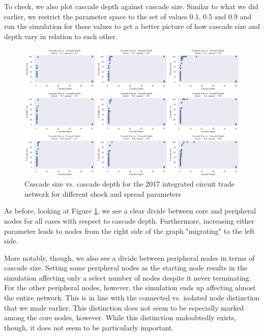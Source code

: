 \documentclass[12pt,letterpaper]{report}
\begin{document}
				To check, we also plot cascade depth against cascade size. Similar to what we did earlier, we restrict the parameter space to the set of values 0.1, 0.5 and 0.9 and run the simulation for these values to get a better picture of how cascade size and depth vary in relation to each other.
				
				\begin{figure}[!h]
					\centering
					\includegraphics[width=\textwidth]{Fig517-CascadeSizevsDepth.png}
					\caption{Cascade size vs. cascade depth for the 2017 integrated circuit trade network for different shock and spread parameters}\label{fig:517CascadeSizevsDepth}
				\end{figure}
				
				As before, looking at Figure \ref{fig:517CascadeSizevsDepth}, we see a clear divide between core and peripheral nodes for all cases with respect to cascade depth. Furthermore, increasing either parameter leads to nodes from the right side of the graph "migrating" to the left side. 
				
				More notably, though, we also see a divide between peripheral nodes in terms of cascade size. Setting some peripheral nodes as the starting node results in the simulation affecting only a select number of nodes despite it never terminating. For the other peripheral nodes, however, the simulation ends up affecting almost the entire network. This is in line with the connected vs. isolated node distinction that we made earlier. This distinction does not seem to be especially marked among the core nodes, however. While this distinction undoubtedly exists, though, it does not seem to be particularly important.
\end{document}
